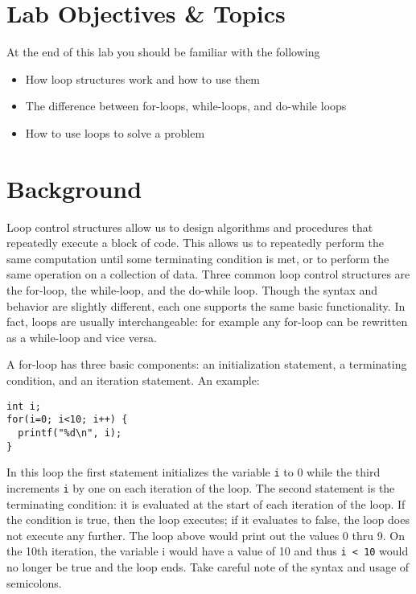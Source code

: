 \documentclass[12pt]{scrartcl}
\begin{document}
\section{Lab Objectives \& Topics}
At the end of this lab you should be familiar with the following
\begin{itemize}
  \item How loop structures work and how to use them
  \item The difference between for-loops, while-loops, and do-while loops
  \item How to use loops to solve a problem
\end{itemize}

\section{Background}

Loop control structures allow us to design algorithms and procedures 
that repeatedly execute a block of code.  This allows us to repeatedly 
perform the same computation until some terminating condition is met, 
or to perform the same operation on a collection of data.  Three 
common loop control structures are the for-loop, the while-loop, and 
the do-while loop.  Though the syntax and behavior are slightly different, 
each one supports the same basic functionality.  In fact, loops are 
usually interchangeable: for example any for-loop can be rewritten 
as a while-loop and vice versa.

A for-loop has three basic components: an initialization statement, 
a terminating condition, and an iteration statement.  An example:

\begin{verbatim}
int i;
for(i=0; i<10; i++) {
  printf("%d\n", i); 
}
\end{verbatim}

In this loop the first statement initializes the variable \texttt{i} 
to 0 while the third increments \texttt{i} by one on each 
iteration of the loop.  The second statement is the terminating 
condition: it is evaluated at the start of each iteration of the loop.  
If the condition is true, then the loop executes; if it evaluates to 
false, the loop does not execute any further.  The loop above 
would print out the values 0 thru 9.  On the 10th iteration, the 
variable i would have a value of 10 and thus \texttt{i < 10} 
would no longer be true and the loop ends.  Take careful note of the 
syntax and usage of semicolons.
\end{document}
